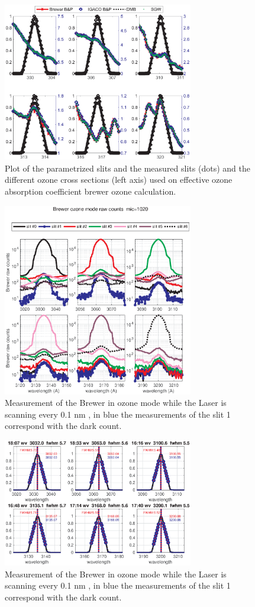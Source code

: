 \documentclass[acp]{copernicus} %
\begin{document}
%
\begin{figure}[t]
\includegraphics[width=8.3cm]{figures/General_Laser_Brewer_ozone_mode.eps}
\caption{ Plot of the parametrized slits and the measured slits (dots)  and the different ozone cross sections (left axis) used on effective ozone absorption coefficient brewer ozone calculation.}
\label{fig:param}
\end{figure}


%
\begin{figure}[t]
\includegraphics[width=8.3cm]{figures/General_laser_log.eps}
\caption{ Measurement of the Brewer in ozone mode while the Laser is scanning every 0.1 nm , in blue the measurements of the slit 1 correspond with the dark count.}
\label{fig:laser_log}
\end{figure}

%
\begin{figure}[t]
\includegraphics[width=8.3cm]{figures/General_Laser_scan_dsp.eps}
\caption{ Measurement of the Brewer in ozone mode while the Laser is scanning every 0.1 nm , in blue the measurements of the slit 1 correspond with the dark count.}
\label{fig:laser_dsp}
\end{figure}
\end{document}
